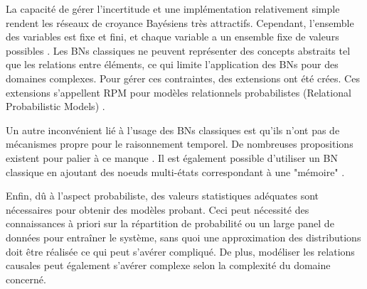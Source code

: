 \documentclass[a4paper,11pt,twoside]{StyleThese}
\begin{document}
La capacité de gérer l'incertitude et une implémentation relativement simple rendent les réseaux de croyance Bayésiens très attractifs.
Cependant, l'ensemble des variables est fixe et fini, et chaque variable a un ensemble fixe de valeurs possibles \cite{russell2003artificial}.
Les BNs classiques ne peuvent représenter des concepts abstraits tel que les relations entre éléments, ce qui limite l'application des BNs pour
des domaines complexes. Pour gérer ces contraintes, des extensions ont été crées. Ces extensions s'appellent RPM pour modèles relationnels probabilistes (Relational Probabilistic Models) \cite{howard2005situation,russell2003artificial}.

Un autre inconvénient lié à l'usage des BNs classiques est qu'ils n'ont pas de mécanismes propre pour le raisonnement temporel.
De nombreuses propositions existent pour palier à ce manque \cite{russell2003artificial}. Il est également possible d'utiliser un BN classique en ajoutant des noeuds multi-états correspondant à une "mémoire" \cite{higgins2005automatic}.

Enfin, dû à l'aspect probabiliste, des valeurs statistiques adéquates sont nécessaires pour obtenir des modèles probant.
Ceci peut nécessité des connaissances à priori sur la répartition de probabilité ou un large panel de données pour entraîner le système, sans quoi une approximation des distributions doit être réalisée ce qui peut s'avérer compliqué. De plus, modéliser les relations causales peut également s'avérer complexe selon la complexité du domaine concerné.



\end{document}
